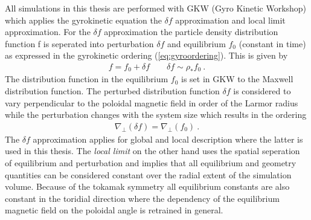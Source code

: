 All simulations in this thesis are performed with GKW (Gyro Kinetic Workshop) which applies the gyrokinetic equation the $\delta f$ approximation and local limit approximation. For the $\delta f$ approximation the particle density distribution function f is seperated into perturbation $\delta f$ and equilibrium $f_0$ (constant in time) as expressed in the gyrokinetic ordering (\ref{eq:gyroordering}). This is given by
\begin{gather}
	f = f_0 + \delta f \qquad \delta f \sim \rho_* f_0~.
\end{gather}
The distribution function in the equilibrium $f_0$ is set in GKW to the Maxwell distribution function. The perturbed distribution function $\delta f$ is considered to vary perpendicular to the poloidal magnetic field in order of the Larmor radius while the perturbation changes with the system size which results in the ordering
\begin{gather}
	\nabla_\perp(\delta f) = \nabla_\perp (f_0)~.
\end{gather}
The $\delta f$ approximation applies for global and local description where the latter is used in this thesis.
The \textit{local limit} on the other hand uses the spatial seperation of equilibrium and perturbation and implies that all equilibrium and geometry quantities can be considered constant over the radial extent of the simulation volume. Because of the tokamak symmetry all equilibrium constants are also constant in the toridial direction where the dependency of the equilibrium magnetic field on the poloidal angle is retrained in general. \\\bigskip

